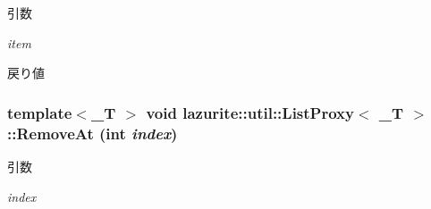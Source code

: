 \begin{DoxyParams}{引数}
\item[{\em item}]\end{DoxyParams}
\begin{DoxyReturn}{戻り値}

\end{DoxyReturn}
\hypertarget{classlazurite_1_1util_1_1_list_proxy_3_01___t_01_4_a4553ca037303249d30bbaec5a6d41450}{
\subsubsection[{RemoveAt}]{\setlength{\rightskip}{0pt plus 5cm}template$<$\_\-T $>$ void lazurite::util::ListProxy$<$ \_\-T $>$::RemoveAt (int {\em index})}}
\label{classlazurite_1_1util_1_1_list_proxy_3_01___t_01_4_a4553ca037303249d30bbaec5a6d41450}

\begin{DoxyParams}{引数}
\item[{\em index}]\end{DoxyParams}


